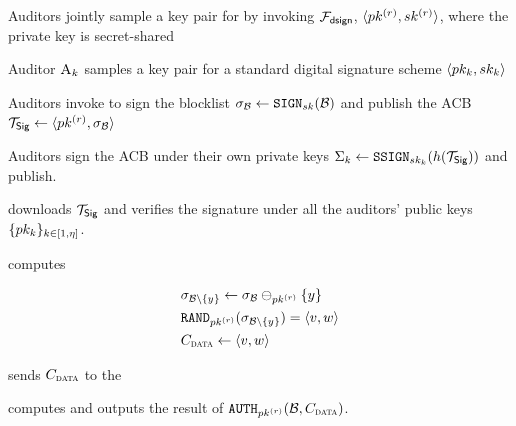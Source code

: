 \begin{algorithm}
\caption{Homomorphic Signature Based Blocklisted}
\label{acb:sig}
\footnotesize
\begin{algorithmic}[1]

\Procedure{\publishList}{\blocklist}



\State Auditors jointly sample a key pair for  by invoking $\mathcal{F}_{\mathsf{dsign}}$, $\langle \auditorPubKeyOurScheme, \auditorPrivKeyOurScheme \rangle$, where the private key is secret-shared

\State Auditor $\auditor[\auditorIdx]$ samples a key pair for a standard digital signature scheme $\langle \auditorPubKeyGenericScheme[\auditorIdx], \auditorPrivKeyGenericScheme[\auditorIdx] \rangle$

\State Auditors invoke \distSigningFunc to sign the blocklist $\genericSig[\blocklist] \assign \signingAlg[\privKey](\blocklist)$ and publish the ACB $\sigBlklistToken \assign \langle \auditorPubKeyOurScheme, \genericSig[\blocklist] \rangle$

\State Auditors sign the ACB  under their own private keys $\auditorSig{\auditorIdx} \assign \signGenSig[\auditorPrivKeyGenericScheme[\auditorIdx]](\hashFn(\sigBlklistToken)) $ and publish. 


\State \client downloads $\sigBlklistToken$ and verifies the signature under all the auditors' public keys $\{\auditorPubKeyGenericScheme[\auditorIdx]\}_{\auditorIdx \in [1, \numAuditors]}$. 

\EndProcedure



\Statex\Procedure{\searchBlocklist}{\genericCInputElmt, \sigBlklistToken}
%

\State \client computes 

\begin{align*}
&\genericSig[\blocklist \setminus \{\genericCInputElmt\}] \assign \genericSig[\blocklist] \sigMinus[\auditorPubKeyOurScheme] \{ \genericCInputElmt \} \\
&\randomize[\auditorPubKeyOurScheme](\genericSig[\blocklist \setminus \{\genericCInputElmt \}]) = \langle \genericSigPair[1], \genericSigPair[2] \rangle \\
&\clientMeta \assign \langle \genericSigPair[1], \genericSigPair[2] \rangle
\end{align*}

\client sends $\clientMeta$ to the \server

\State \server computes and outputs the result of $\verifyRand[\auditorPubKeyOurScheme](\blocklist, \clientMeta)$.
\EndProcedure 


\end{algorithmic}
\end{algorithm}

